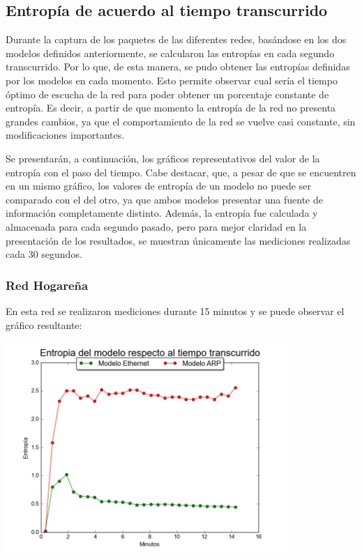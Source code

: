 \subsection{Entropía de acuerdo al tiempo transcurrido}

Durante la captura de los paquetes de las diferentes redes, basándose en los dos modelos definidos anteriormente, se calcularon las entropías en cada segundo transcurrido. Por lo que, de esta manera, se pudo obtener las entropías definidas por los modelos en cada momento. Esto permite observar cual sería el tiempo óptimo de escucha de la red para poder obtener un porcentaje constante de entropía. Es decir, a partir de que momento la entropía de la red no presenta grandes cambios, ya que el comportamiento de la red se vuelve casi constante, sin modificaciones importantes. 

Se presentarán, a continuación, los gráficos representativos del valor de la entropía con el paso del tiempo. Cabe destacar, que, a pesar de que se encuentren en un mismo gráfico, los valores de entropía de un modelo no puede ser comparado con el del otro, ya que ambos modelos presentar una fuente de información completamente distinto. Además, la entropía fue calculada y almacenada para cada segundo pasado, pero para mejor claridad en la presentación de los resultados, se muestran únicamente las mediciones realizadas cada 30 segundos. 

\subsubsection{Red Hogareña}
En esta red se realizaron mediciones durante 15 minutos y se puede observar el gráfico resultante:

\centerline{\includegraphics[width=0.8\textwidth]{./graficos/entrophyVSTime/casa_mari.png}}

